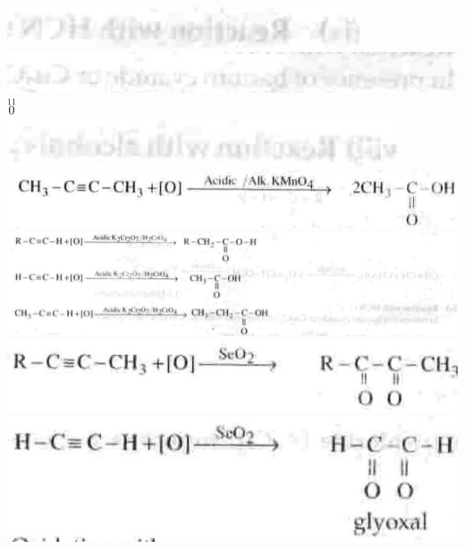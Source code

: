 \documentclass[10pt]{article}
\begin{document}
\includegraphics[max width=\textwidth, center]{2025_01_28_8470952b98110cec3aabg-192(2)}\\
\includegraphics[max width=\textwidth, center]{2025_01_28_8470952b98110cec3aabg-192(6)}\\
$\stackrel{11}{0}$\\
\includegraphics[max width=\textwidth, center]{2025_01_28_8470952b98110cec3aabg-192}\\
\includegraphics[max width=\textwidth, center]{2025_01_28_8470952b98110cec3aabg-192(7)}\\
\includegraphics[max width=\textwidth, center]{2025_01_28_8470952b98110cec3aabg-192(12)}\\
\includegraphics[max width=\textwidth, center]{2025_01_28_8470952b98110cec3aabg-192(5)}\\
\includegraphics[max width=\textwidth, center]{2025_01_28_8470952b98110cec3aabg-192(8)}\\
\end{document}
